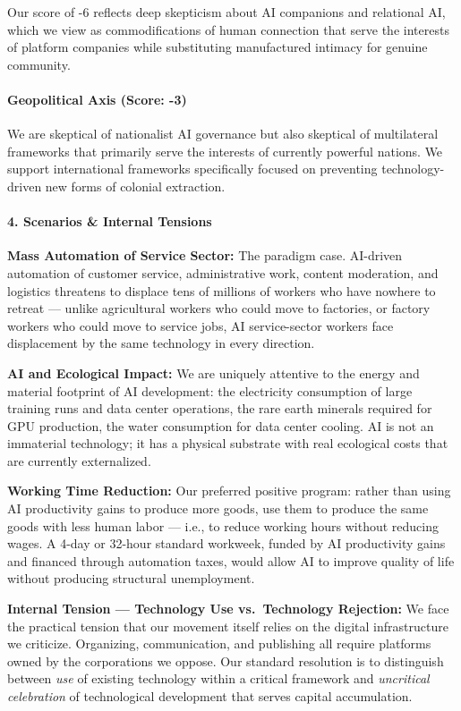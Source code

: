 Our score of -6 reflects deep skepticism about AI companions and
relational AI, which we view as commodifications of human connection
that serve the interests of platform companies while substituting
manufactured intimacy for genuine community.

\paragraph{Geopolitical Axis (Score:
-3)}\label{geopolitical-axis-score--3}

We are skeptical of nationalist AI governance but also skeptical of
multilateral frameworks that primarily serve the interests of currently
powerful nations. We support international frameworks specifically
focused on preventing technology-driven new forms of colonial
extraction.

\paragraph{4. Scenarios \& Internal
Tensions}\label{scenarios-internal-tensions-6}

\textbf{Mass Automation of Service Sector:} The paradigm case. AI-driven
automation of customer service, administrative work, content moderation,
and logistics threatens to displace tens of millions of workers who have
nowhere to retreat --- unlike agricultural workers who could move to
factories, or factory workers who could move to service jobs, AI
service-sector workers face displacement by the same technology in every
direction.

\textbf{AI and Ecological Impact:} We are uniquely attentive to the
energy and material footprint of AI development: the electricity
consumption of large training runs and data center operations, the rare
earth minerals required for GPU production, the water consumption for
data center cooling. AI is not an immaterial technology; it has a
physical substrate with real ecological costs that are currently
externalized.

\textbf{Working Time Reduction:} Our preferred positive program: rather
than using AI productivity gains to produce more goods, use them to
produce the same goods with less human labor --- i.e., to reduce working
hours without reducing wages. A 4-day or 32-hour standard workweek,
funded by AI productivity gains and financed through automation taxes,
would allow AI to improve quality of life without producing structural
unemployment.

\textbf{Internal Tension --- Technology Use vs.~Technology Rejection:}
We face the practical tension that our movement itself relies on the
digital infrastructure we criticize. Organizing, communication, and
publishing all require platforms owned by the corporations we oppose.
Our standard resolution is to distinguish between \emph{use} of existing
technology within a critical framework and \emph{uncritical celebration}
of technological development that serves capital accumulation.

